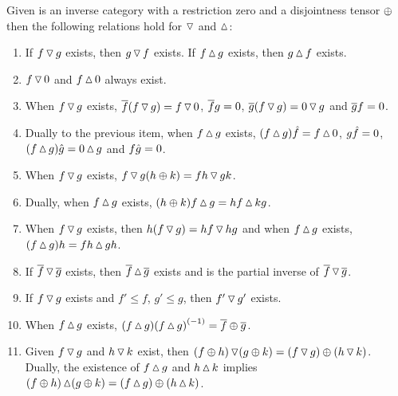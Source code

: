 \begin{lemma}\label{lem:properties_of_tjdown_and_tjup}
  Given \X is an inverse category with a restriction zero and a disjointness tensor $\+$ then the
  following relations hold for $\tjdown$ and $\tjup$:
   \begin{enumerate}[{(}i{)}]
    \item If $f \tjdown g$ exists, then $g \tjdown f$ exists. If $f \tjup g$ exists, then
    $g \tjup f$ exists. \label{lemitem:l_r_commute}
    \item $f \tjdown 0$ and $f \tjup 0$ always exist. \label{lemitem:l_r_zero_exists}
    \item When $f\tjdown g$ exists, $\rst{f}(f\tjdown g) = f \tjdown 0$, $\rst{f}g = 0$,
      $\rst{g}(f \tjdown g) = 0 \tjdown g$ and $\rst{g}f = 0$.
      \label{lemitem:l_r_rst_orthogonal_to_zero}
    \item Dually to the previous item, when $f\tjup g$ exists,
      $(f\tjup g)\rg{f} = f \tjup 0$, $g\rg{f} = 0$, $(f \tjup g)\rg{g} = 0 \tjup g$ and
      $f\rg{g} = 0$.\label{lemitem:l_r_rg_orthogonal_to_zero}
    \item When $f\tjdown g$ exists, $f\tjdown g (h\+k) = f h \tjdown g k$.
      \label{lemitem:l_r_l_pull_right}
    \item Dually, when $f \tjup g$ exists, $(h \+ k) f \tjup g = h f \tjup k g$.
      \label{lemitem:l_r_r_pull_left}
    \item When $f \tjdown g$ exists, then $h(f \tjdown g) = h f \tjdown h g$ and when $f \tjup g$
      exists, $(f \tjup g)h = f h \tjup g h$.
      \label{lemitem:l_r_l_universal_r_stable}
    \item If $\rst{f} \tjdown \rst{g}$ exists, then $\rst{f} \tjup \rst{g}$ exists and is
      the partial inverse of $\rst{f} \tjdown \rst{g}$.
      \label{lemitem:l_r_rst_inverses}
    \item If $f\tjdown g$ exists and $f' \le f$, $g' \le g$, then $f' \tjdown g'$ exists.
      \label{lemitem:l_r_less_than}
    \item When $f\tjup g$ exists, $(f\tjup g) \inv{(f\tjup g)} = \rst{f}\+\rst{g}$.
      \label{lemitem:l_r_rst_is_natural}
    \item Given $f\tjdown g$ and $h\tjdown k$ exist, then
      $(f\+h)\tjdown(g\+k) = (f\tjdown g)\+ (h\tjdown k)$. Dually, the existence of $f\tjup g$
      and $h\tjup k$ implies $(f\+h)\tjup(g\+k) = (f\tjup g)\+ (h\tjup k)$.
      \label{lemitem:l_r_preserve_tensor}
  \end{enumerate}
\end{lemma}
